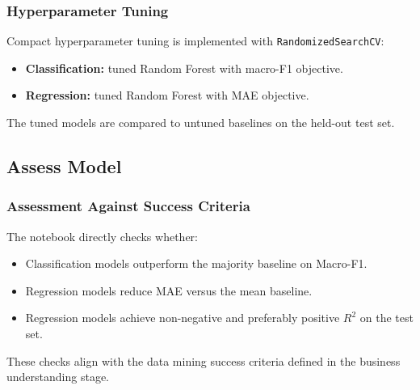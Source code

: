 \subsubsection{Hyperparameter Tuning}

Compact hyperparameter tuning is implemented with \texttt{RandomizedSearchCV}:
\begin{itemize}
    \item \textbf{Classification:} tuned Random Forest with macro-F1 objective.
    \item \textbf{Regression:} tuned Random Forest with MAE objective.
\end{itemize}
The tuned models are compared to untuned baselines on the held-out test set.

\subsection{Assess Model}

\subsubsection{Assessment Against Success Criteria}

The notebook directly checks whether:
\begin{itemize}
    \item Classification models outperform the majority baseline on Macro-F1.
    \item Regression models reduce MAE versus the mean baseline.
    \item Regression models achieve non-negative and preferably positive $R^2$ on the test set.
\end{itemize}

These checks align with the data mining success criteria defined in the business understanding stage.

